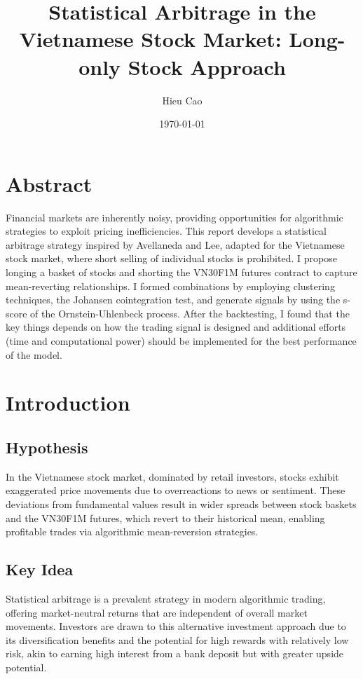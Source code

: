 \documentclass[a4paper,12pt]{article}
\title{Statistical Arbitrage in the Vietnamese Stock Market: Long-only Stock Approach}
\author{Hieu Cao}
\date{\today}
\begin{document}
\maketitle

\section*{Abstract}
Financial markets are inherently noisy, providing opportunities for algorithmic strategies to exploit pricing inefficiencies. This report develops a statistical arbitrage strategy inspired by Avellaneda and Lee, adapted for the Vietnamese stock market, where short selling of individual stocks is prohibited. I propose longing a basket of stocks and shorting the VN30F1M futures contract to capture mean-reverting relationships. I formed combinations by employing clustering techniques, the Johansen cointegration test, and generate signals by using the s-score of the Ornstein-Uhlenbeck process. After the backtesting, I found that the key things depends on how the trading signal is designed and additional efforts (time and computational power) should be implemented for the best performance of the model.

\section{Introduction}
\subsection{Hypothesis} 
In the Vietnamese stock market, dominated by retail investors, stocks exhibit exaggerated price movements due to overreactions to news or sentiment. These deviations from fundamental values result in wider spreads between stock baskets and the VN30F1M futures, which revert to their historical mean, enabling profitable trades via algorithmic mean-reversion strategies. 

\subsection{Key Idea}
Statistical arbitrage is a prevalent strategy in modern algorithmic trading, offering market-neutral returns that are independent of overall market movements. Investors are drawn to this alternative investment approach due to its diversification benefits and the potential for high rewards with relatively low risk, akin to earning high interest from a bank deposit but with greater upside potential.
\end{document}
